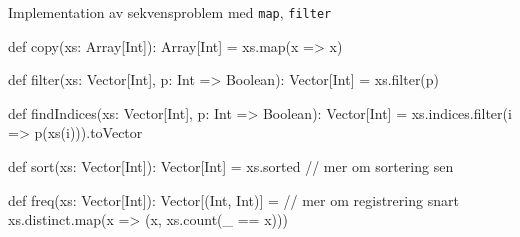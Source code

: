 \begin{Slide}{Implementation av sekvensproblem med \texttt{map}, \texttt{filter}}
\begin{Code}
def copy(xs: Array[Int]): Array[Int] = xs.map(x => x)

def filter(xs: Vector[Int], p: Int => Boolean): Vector[Int] = xs.filter(p)

def findIndices(xs: Vector[Int], p: Int => Boolean): Vector[Int] =
  xs.indices.filter(i => p(xs(i))).toVector

def sort(xs: Vector[Int]): Vector[Int] = xs.sorted // mer om sortering sen

def freq(xs: Vector[Int]): Vector[(Int, Int)] = // mer om registrering snart
  xs.distinct.map(x => (x, xs.count(_ == x)))
\end{Code}
\end{Slide}


